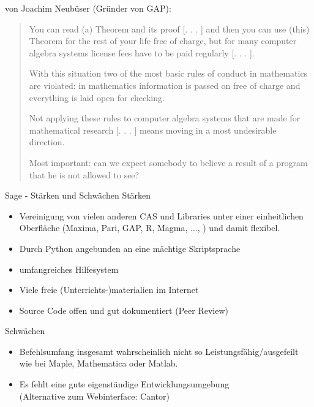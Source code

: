 \documentclass[hyperref={xetex}]{beamer}
\begin{document}
\begin{frame}{}
von Joachim Neubüser (Gründer von GAP):
 \begin{small}
\begin{quote}
    \alert{You can read (a) Theorem and its proof [. . . ] and then
    you can use (this) Theorem for the rest of your life free of
    charge, but for many computer algebra systems license fees
    have to be paid regularly [. . . ]}.  

With this situation \alert{two of the most basic rules of conduct in
mathematics are violated: in mathematics information is
passed on free of charge and everything is laid open for
checking}. 

Not applying these rules to computer algebra
systems that are made for mathematical research [. . . ]
means moving in a most undesirable direction. 

Most important: can we expect somebody to believe a result of a
program that he is not allowed to see?  
\end{quote}
 \end{small}

\end{frame}




\begin{frame}[<+->]{Sage - Stärken und Schwächen}
\alert{Stärken}
\begin{itemize}
\item Vereinigung von vielen anderen CAS und Libraries unter einer einheitlichen Oberfläche (Maxima, Pari,
GAP, R, Magma, ..., ) und damit flexibel.
\item Durch Python angebunden an eine mächtige Skriptsprache
\item umfangreiches Hilfesystem
\item Viele freie (Unterrichts-)materialien im Internet 
\item Source Code offen und gut dokumentiert (Peer Review)
\end{itemize}
\pause
\alert{Schwächen}
\begin{itemize}
\item Befehlsumfang insgesamt wahrscheinlich nicht so Leistungsfähig/ausgefeilt wie bei Maple, Mathematica oder Matlab.
\item Es fehlt eine gute eigenständige Entwicklungsumgebung\\(Alternative zum Webinterface: \alert{Cantor})
\end{itemize}
\end{frame}
\end{document}
